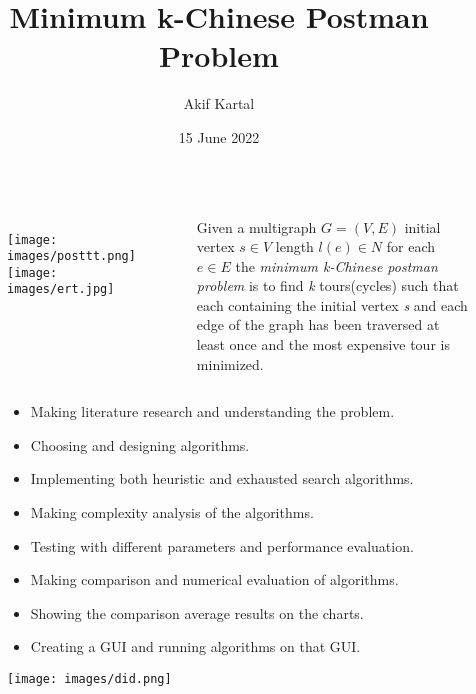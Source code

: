 \documentclass{beamer}
\begin{document}
 
\begin{frontpage}
  \title{Minimum k-Chinese Postman Problem}
  \author{Akif Kartal}
  \date{15 June 2022}
\end{frontpage}



\begin{projectdefinition}
  	\begin{columns}[c] %
		
		\begin{figure}
		    \centering
		    \texttt{[image: images/posttt.png]}
		    \texttt{[image: images/ert.jpg]}
		    \label{fig:widerface5}
	    \end{figure}
	  
Given a multigraph $G = (V,E)$ initial vertex $s \in V$ length $l(e) \in N$ for each $e \in E$ the \textit{minimum k-Chinese postman problem} is to find \textit{k} tours(cycles) such that each containing the initial vertex \textit{s} and each edge of the graph has been traversed at least once and the most expensive tour is minimized.\cite{book1}
\end{columns}
\end{projectdefinition}

\begin{result}
 
        
		\begin{figure}
		\begin{itemize}
        \item Making literature research and understanding the problem.
		\item Choosing and designing algorithms.
		\item Implementing both heuristic and exhausted search algorithms.
		\item Making complexity analysis of the algorithms.
		\item Testing with different parameters and performance evaluation.
		\item Making comparison and numerical evaluation of algorithms.
		\item Showing the comparison average results on the charts.
		\item Creating a GUI and running algorithms on that GUI.
\end{itemize}
            \vspace{0.03\textheight}
		    \texttt{[image: images/did.png]}
		    \label{fig:widerface}
	    \end{figure}
		
\end{result}
\end{document}
